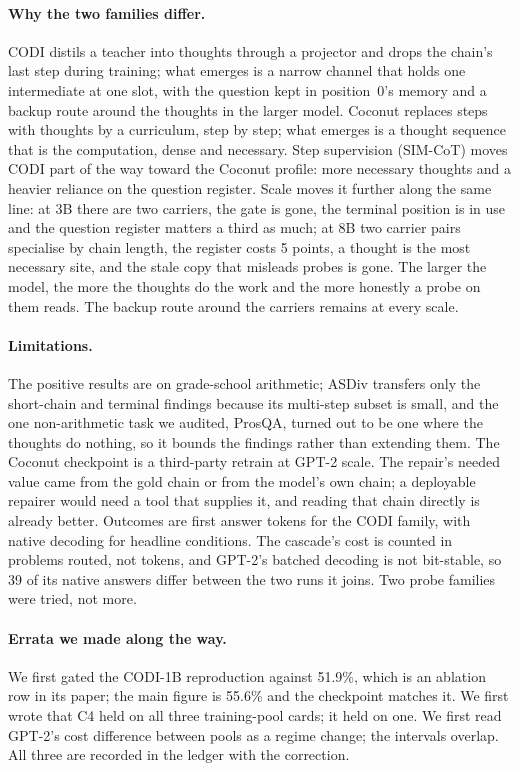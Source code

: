 \documentclass{article}
\begin{document}
\paragraph{Why the two families differ.} CODI distils a teacher into thoughts through a projector and drops the chain's last step during training; what emerges is a narrow channel that holds one intermediate at one slot, with the question kept in position~0's memory and a backup route around the thoughts in the larger model. Coconut replaces steps with thoughts by a curriculum, step by step; what emerges is a thought sequence that is the computation, dense and necessary. Step supervision (SIM-CoT) moves CODI part of the way toward the Coconut profile: more necessary thoughts and a heavier reliance on the question register. Scale moves it further along the same line: at 3B there are two carriers, the gate is gone, the terminal position is in use and the question register matters a third as much; at 8B two carrier pairs specialise by chain length, the register costs 5 points, a thought is the most necessary site, and the stale copy that misleads probes is gone. The larger the model, the more the thoughts do the work and the more honestly a probe on them reads. The backup route around the carriers remains at every scale.

\paragraph{Limitations.} The positive results are on grade-school arithmetic; ASDiv transfers only the short-chain and terminal findings because its multi-step subset is small, and the one non-arithmetic task we audited, ProsQA, turned out to be one where the thoughts do nothing, so it bounds the findings rather than extending them. The Coconut checkpoint is a third-party retrain at GPT-2 scale. The repair's needed value came from the gold chain or from the model's own chain; a deployable repairer would need a tool that supplies it, and reading that chain directly is already better. Outcomes are first answer tokens for the CODI family, with native decoding for headline conditions. The cascade's cost is counted in problems routed, not tokens, and GPT-2's batched decoding is not bit-stable, so 39 of its native answers differ between the two runs it joins. Two probe families were tried, not more.

\paragraph{Errata we made along the way.} We first gated the CODI-1B reproduction against 51.9\%, which is an ablation row in its paper; the main figure is 55.6\% and the checkpoint matches it. We first wrote that C4 held on all three training-pool cards; it held on one. We first read GPT-2's cost difference between pools as a regime change; the intervals overlap. All three are recorded in the ledger with the correction.
\end{document}
